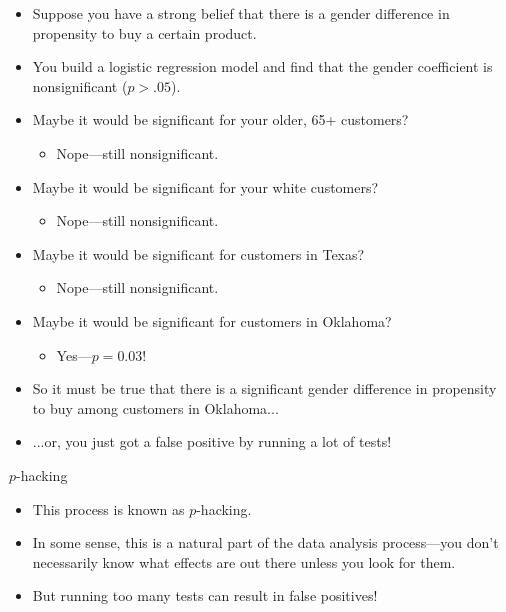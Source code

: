 \documentclass{beamer}\usepackage[]{graphicx}\usepackage[]{color}
\begin{document}
\begin{darkframes}
    \begin{frame}
      \begin{itemize}[<+->]
        \item Suppose you have a strong belief that there is a gender difference in propensity to buy a certain product.
        \item You build a logistic regression model and find that the gender coefficient is nonsignificant ($p>.05$).
        \item Maybe it would be significant for your older, 65+ customers?
          \begin{itemize} \item Nope---still nonsignificant. \end{itemize}
        \item Maybe it would be significant for your white customers?
          \begin{itemize} \item Nope---still nonsignificant. \end{itemize}
        \item Maybe it would be significant for customers in Texas?
          \begin{itemize} \item Nope---still nonsignificant. \end{itemize}
        \item Maybe it would be significant for customers in Oklahoma?
          \begin{itemize} \item Yes---$p=0.03$! \end{itemize}
        \item So it must be true that there is a significant gender difference in propensity to buy among customers in Oklahoma...
        \item ...or, you just got a false positive by running a lot of tests!
      \end{itemize}
    \end{frame}

    \begin{frame}{$p$-hacking}
      \begin{itemize}[<+->]
        \item This process is known as \alert{$p$-hacking}.
        \item In some sense, this is a natural part of the data analysis process---you don't necessarily know what effects are out there unless you look for them.
        \item But running too many tests can result in false positives!
      \end{itemize}
    \end{frame}


\end{darkframes}
\end{document}
